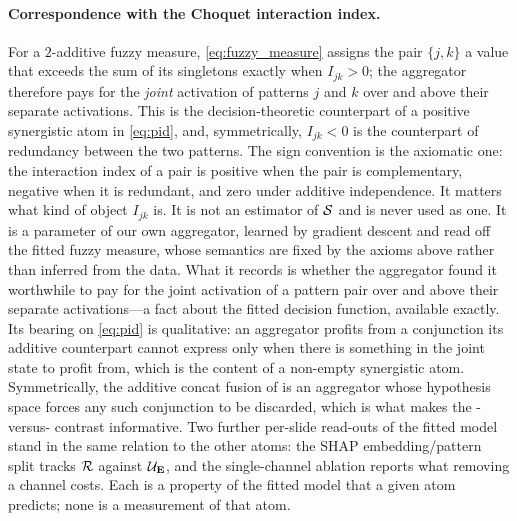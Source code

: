 \paragraph{Correspondence with the Choquet interaction index.}
For a $2$-additive fuzzy measure, \cref{eq:fuzzy_measure} assigns
the pair $\{j,k\}$ a value that exceeds the sum of its singletons
exactly when $I_{jk}>0$; the aggregator therefore pays for the
\emph{joint} activation of patterns $j$ and $k$ over and above
their separate
activations.\cite{grabisch1996application}
This is the decision-theoretic counterpart of a positive
synergistic atom in \cref{eq:pid}, and, symmetrically, $I_{jk}<0$
is the counterpart of redundancy between the two patterns.
The sign convention is the axiomatic one: the interaction index of a
pair is positive when the pair is complementary, negative when it is
redundant, and zero under additive independence.
It matters what kind of object $I_{jk}$ is. It is not an estimator of
$\mathcal{S}$ and is never used as one. It is a parameter of our own
aggregator, learned by gradient descent and read off the fitted fuzzy
measure, whose semantics are fixed by the axioms above rather than
inferred from the data. What it records is whether the aggregator found
it worthwhile to pay for the joint activation of a pattern pair over and
above their separate activations---a fact about the fitted decision
function, available exactly. Its bearing on \cref{eq:pid} is
qualitative: an aggregator profits from a conjunction its additive
counterpart cannot express only when there is something in the joint
state to profit from, which is the content of a non-empty synergistic
atom. Symmetrically, the additive concat fusion of \piabmil{} is an
aggregator whose hypothesis space forces any such conjunction to be
discarded, which is what makes the \fcmil{}-versus-\piabmil{} contrast
informative.
Two further per-slide read-outs of the fitted model stand in the same
relation to the other atoms: the SHAP embedding/pattern split tracks
$\mathcal{R}$ against $\mathcal{U}_{\mathbf{E}}$, and the single-channel ablation
reports what removing a channel costs. Each is a property of the fitted
model that a given atom predicts; none is a measurement of that atom.

